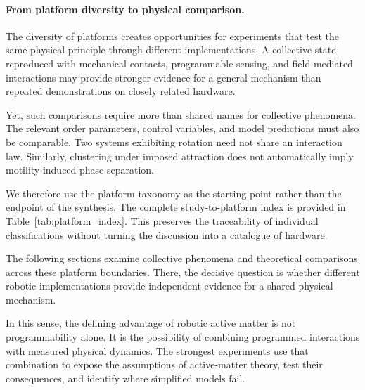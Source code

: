\paragraph*{From platform diversity to physical comparison.}

The diversity of platforms creates opportunities
for experiments that test the same physical
principle through different implementations.
A collective state reproduced with mechanical
contacts, programmable sensing, and
field-mediated interactions may provide
stronger evidence for a general mechanism
than repeated demonstrations on closely
related hardware.

Yet, such comparisons require more than
shared names for collective phenomena.
The relevant order parameters, control
variables, and model predictions
must also be comparable.
Two systems exhibiting rotation
need not share an interaction
law. Similarly, clustering
under imposed attraction
does not automatically imply
motility-induced phase
separation.

We therefore use the platform taxonomy
as the starting point rather than
the endpoint of the synthesis.
The complete study-to-platform
index is provided in
Table~\ref{tab:platform_index}.
This preserves the traceability
of individual classifications
without turning the discussion
into a catalogue of hardware.

The following sections examine
collective phenomena and theoretical
comparisons across these platform
boundaries. There, the decisive
question is whether different
robotic implementations provide
independent evidence for a
shared physical mechanism.

In this sense, the defining
advantage of robotic active
matter is not programmability
alone. It is the possibility
of combining programmed
interactions with measured
physical dynamics. The
strongest experiments use
that combination to expose
the assumptions of
active-matter theory,
test their consequences,
and identify where
simplified models fail.